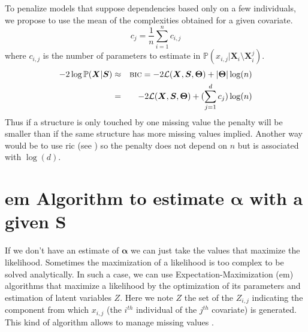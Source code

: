 \documentclass[12pt,a4paper]{report}
\begin{document}
			To penalize models that suppose dependencies based only on a few individuals, we propose to use the mean of the complexities obtained for a given covariate.
			\begin{equation}
			c_j=\frac{1}{n}\sum_{i=1}^nc_{i,j}  \nonumber 
\end{equation}						where $c_{i,j}$ is the number of parameters to estimate in $\mathbb{P}(x_{i,j}|\boldsymbol{X}_i\setminus \boldsymbol{X}_i^j)$.
			\begin{eqnarray}
		-2\log \mathbb{P}(\boldsymbol{X}|\boldsymbol{S})&\approx & \mbox{{\sc bic}}=-2\mathcal{L}(\boldsymbol{X},\boldsymbol{S},\boldsymbol{\Theta})+|\boldsymbol{\Theta}|\log(n) \nonumber  \\
		&=& -2\mathcal{L}(\boldsymbol{X},\boldsymbol{S},\boldsymbol{\Theta})+(\sum_{j=1}^dc_j)\log(n) \nonumber 
	\end{eqnarray}
			 Thus if a structure is only touched by one missing value the penalty will be smaller than if the same structure has more missing values implied.
			Another way would be to use {\sc ric} (see \cite{foster1994risk}) so the penalty does not depend on $n$ but is associated with $\log(d)$. %
		
%	
			
%	

	\section{{\sc em} Algorithm to estimate $\boldsymbol{\alpha}$ with a given $\boldsymbol{S}$}
			If we don't have an estimate of $\boldsymbol{\alpha}$ we can just take the values that maximize the likelihood. Sometimes the maximization of a likelihood is too complex to be solved analytically. In such a case, we can use Expectation-Maximization ({\sc em}) algorithms \cite{mclachlan2007algorithm} that maximize a likelihood by the optimization of its parameters and estimation of latent variables $Z$. 
Here we note $Z$ the set of the $Z_{i,j}$ indicating the component from which $x_{i,j}$ (the $i^{th}$ individual of the $j^{th}$ covariate) is generated.			
			This kind of algorithm allows to manage missing values \cite{dempster1977maximum}. \\
			
\end{document}
